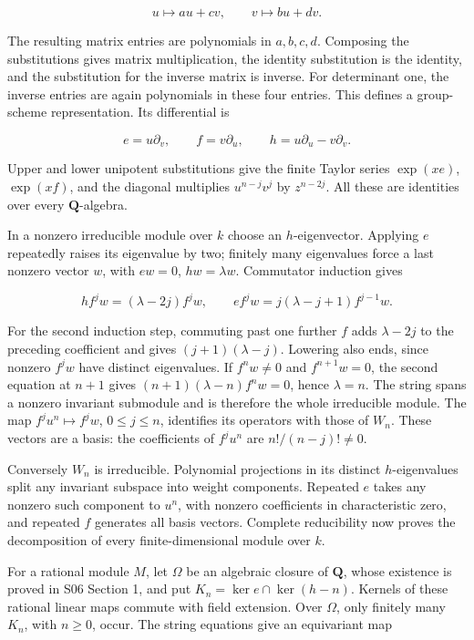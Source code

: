 \documentclass[11pt,a4paper,openany]{report}
\begin{document}
\[
u\longmapsto au+cv,\qquad v\longmapsto bu+dv.
\]

The resulting matrix entries are polynomials in \(a,b,c,d\). Composing the substitutions gives matrix multiplication, the identity substitution is the identity, and the substitution for the inverse matrix is inverse. For determinant one, the inverse entries are again polynomials in these four entries. This defines a group-scheme representation. Its differential is

\[
e=u\partial_v,\qquad f=v\partial_u,\qquad
h=u\partial_u-v\partial_v.
\]

Upper and lower unipotent substitutions give the finite Taylor series \(\exp(xe)\), \(\exp(xf)\), and the diagonal multiplies \(u^{n-j}v^j\) by \(z^{n-2j}\). All these are identities over every \(\mathbf Q\)-algebra.

In a nonzero irreducible module over \(k\) choose an \(h\)-eigenvector. Applying \(e\) repeatedly raises its eigenvalue by two; finitely many eigenvalues force a last nonzero vector \(w\), with \(ew=0\), \(hw=\lambda w\). Commutator induction gives

\[
hf^jw=(\lambda-2j)f^jw,\qquad
ef^jw=j(\lambda-j+1)f^{j-1}w.
\]

For the second induction step, commuting past one further \(f\) adds \(\lambda-2j\) to the preceding coefficient and gives \((j+1)(\lambda-j)\). Lowering also ends, since nonzero \(f^jw\) have distinct eigenvalues. If \(f^nw\ne0\) and \(f^{n+1}w=0\), the second equation at \(n+1\) gives \((n+1)(\lambda-n)f^nw=0\), hence \(\lambda=n\). The string spans a nonzero invariant submodule and is therefore the whole irreducible module. The map \(f^ju^n\mapsto f^jw\), \(0\le j\le n\), identifies its operators with those of \(W_n\). These vectors are a basis: the coefficients of \(f^ju^n\) are \(n!/(n-j)!\ne0\).

Conversely \(W_n\) is irreducible. Polynomial projections in its distinct \(h\)-eigenvalues split any invariant subspace into weight components. Repeated \(e\) takes any nonzero such component to \(u^n\), with nonzero coefficients in characteristic zero, and repeated \(f\) generates all basis vectors. Complete reducibility now proves the decomposition of every finite-dimensional module over \(k\).

For a rational module \(M\), let \(\Omega\) be an algebraic closure of \(\mathbf Q\), whose existence is proved in S06 Section 1, and put \(K_n=\ker e\cap\ker(h-n)\). Kernels of these rational linear maps commute with field extension. Over \(\Omega\), only finitely many \(K_n\), with \(n\ge0\), occur. The string equations give an equivariant map
\end{document}
